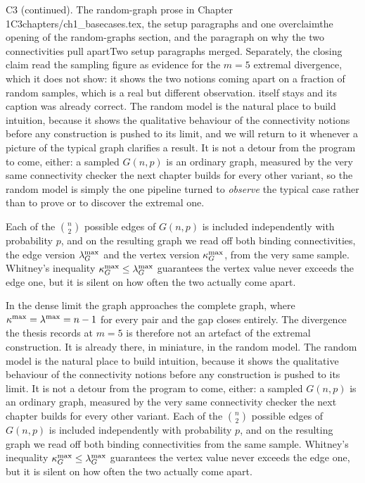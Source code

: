\begin{offcutrewrite}{C3 (continued). The random-graph prose in Chapter 1}{C3}{chapters/ch1\_basecases.tex, the setup paragraphs and one overclaim}{the opening of the random-graphs section, and the paragraph on why the two connectivities pull apart}{Two setup paragraphs merged. Separately, the closing claim read the sampling figure as evidence for the $m=5$ extremal divergence, which it does not show: it shows the two notions coming apart on a fraction of random samples, which is a real but different observation.  itself stays and its caption was already correct.}
The random model is the natural place to build intuition, because it shows the qualitative behaviour of the connectivity notions before any construction is pushed to its limit, and we will return to it whenever a picture of the typical graph clarifies a result. It is not a detour from the program to come, either: a sampled $G(n,p)$ is an ordinary graph, measured by the very same connectivity checker the next chapter builds for every other variant, so the random model is simply the one pipeline turned to \emph{observe} the typical case rather than to prove or to discover the extremal one.

Each of the $\binom{n}{2}$ possible edges of $G(n, p)$ is included independently with probability $p$, and on the resulting graph we read off both binding connectivities, the edge version $\lambda_G^{\max}$ and the vertex version $\kappa_G^{\max}$, from the very same sample. Whitney's inequality $\kappa_G^{\max} \le \lambda_G^{\max}$ guarantees the vertex value never exceeds the edge one, but it is silent on how often the two actually come apart.

In the dense limit the graph approaches the complete graph, where $\kappa^{\max} = \lambda^{\max} = n - 1$ for every pair and the gap closes entirely. The divergence the thesis records at $m = 5$ is therefore not an artefact of the extremal construction. It is already there, in miniature, in the random model.
\nowreads
The random model is the natural place to build intuition, because it shows the qualitative behaviour of the connectivity notions before any construction is pushed to its limit. It is not a detour from the program to come, either: a sampled $G(n,p)$ is an ordinary graph, measured by the very same connectivity checker the next chapter builds for every other variant. Each of the $\binom{n}{2}$ possible edges of $G(n,p)$ is included independently with probability $p$, and on the resulting graph we read off both binding connectivities from the same sample. Whitney's inequality $\kappa_G^{\max} \le \lambda_G^{\max}$ guarantees the vertex value never exceeds the edge one, but it is silent on how often the two actually come apart.


\end{offcutrewrite}
